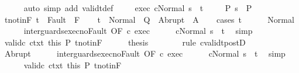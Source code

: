 \begin{isabellebody}
\ \ \ \ \isamarkupfalse%
\ {\isacharparenleft}auto\ simp\ add{\isacharcolon}\ validt{\isacharunderscore}def{\isacharparenright}\ \isanewline
\ \ \isamarkupfalse%
\ exec{\isacharcolon}\ {\isachardoublequoteopen}{\isasymGamma}{\isasymturnstile}{\isasymlangle}c{\isacharcomma}Normal\ s{\isasymrangle}\ {\isasymRightarrow}\ t{\isachardoublequoteclose}\ \isanewline
\ \ \isamarkupfalse%
\ P{\isacharcolon}\ {\isachardoublequoteopen}s\ {\isasymin}\ P{\isachardoublequoteclose}\isanewline
\ \ \isamarkupfalse%
\ t{\isacharunderscore}notin{\isacharunderscore}F{\isacharcolon}\ {\isachardoublequoteopen}t\ {\isasymnotin}\ Fault\ {\isacharbackquote}\ F{\isachardoublequoteclose}\isanewline
\ \ \isamarkupfalse%
\ {\isachardoublequoteopen}t\ {\isasymin}\ Normal\ {\isacharbackquote}\ Q\ {\isasymunion}\ Abrupt\ {\isacharbackquote}\ A{\isachardoublequoteclose}\isanewline
\ \ \isamarkupfalse%
\ {\isacharparenleft}cases\ t{\isacharparenright}\isanewline
\ \ \ \ \isamarkupfalse%
\ Normal\isanewline
\ \ \ \ \isamarkupfalse%
\ inter{\isacharunderscore}guards{\isacharunderscore}exec{\isacharunderscore}noFault\ {\isacharbrackleft}OF\ c\ exec{\isacharbrackright}\isanewline
\ \ \ \ \isamarkupfalse%
\ {\isachardoublequoteopen}{\isasymGamma}{\isasymturnstile}{\isasymlangle}cNormal\ s{\isasymrangle}\ {\isasymRightarrow}\ t{\isachardoublequoteclose}\ \isamarkupfalse%
\ simp\isanewline
\ \ \ \ \isamarkupfalse%
\ valid{\isacharunderscore}c{}\ ctxt\ this\ P\ t{\isacharunderscore}notin{\isacharunderscore}F\isanewline
\ \ \ \ \isamarkupfalse%
\ {\isacharquery}thesis\isanewline
\ \ \ \ \ \ \isamarkupfalse%
\ {\isacharparenleft}rule\ cvalidt{\isacharunderscore}postD{\isacharparenright}\isanewline
\ \ \isamarkupfalse%
\isanewline
\ \ \ \ \isamarkupfalse%
\ Abrupt\isanewline
\ \ \ \ \isamarkupfalse%
\ inter{\isacharunderscore}guards{\isacharunderscore}exec{\isacharunderscore}noFault\ {\isacharbrackleft}OF\ c\ exec{\isacharbrackright}\isanewline
\ \ \ \ \isamarkupfalse%
\ {\isachardoublequoteopen}{\isasymGamma}{\isasymturnstile}{\isasymlangle}cNormal\ s{\isasymrangle}\ {\isasymRightarrow}\ t{\isachardoublequoteclose}\ \isamarkupfalse%
\ simp\isanewline
\ \ \ \ \isamarkupfalse%
\ valid{\isacharunderscore}c{}\ ctxt\ this\ P\ t{\isacharunderscore}notin{\isacharunderscore}F\isanewline

\end{isabellebody}
